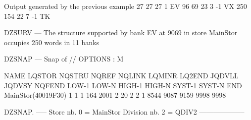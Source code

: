 \begin{landscapebody}
\begin{XMPt}{Output generated by the previous example}
     27     27    27    1     EV                                                                                                 
     96     69    23    3       -1 VX                                                                                            
    250    154    22    7            -1 TK                                                                                       


                                                                                                                                 
DZSURV --- The structure supported by bank EV   at       9069 in store MainStor occupies        250 words in     11 banks        
                                                                                                                                 
DZSNAP --- Snap of //                                                                              OPTIONS : M                   
                                                                                                                                 
  NAME       LQSTOR NQSTRU  NQREF NQLINK LQMINR LQ2END JQDVLL JQDVSY NQFEND  LOW-1  LOW-N HIGH-1 HIGH-N SYST-1 SYST-N    END     
 MainStor(40019F30)      1      1      1    164   2001      2     20      2      2      1   8544   9087   9159   9998   9998     
                                                                                                                                 
DZSNAP.   -----  Store nb. 0 = MainStor Division nb. 2 = QDIV2                       --------------------                        
                                                                                                                                 

\end{XMPt}
\end{landscapebody}

